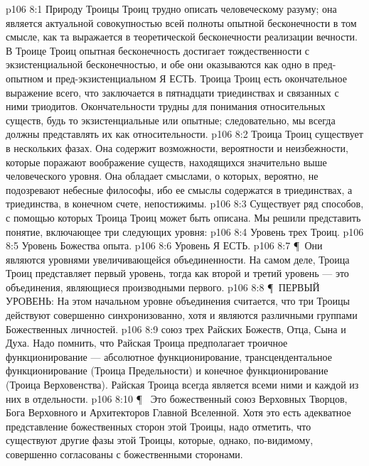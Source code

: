 \vs p106 8:1 Природу Троицы Троиц трудно описать человеческому разуму; она является актуальной совокупностью всей полноты опытной бесконечности в том смысле, как та выражается в теоретической бесконечности реализации вечности. В Троице Троиц опытная бесконечность достигает тождественности с экзистенциальной бесконечностью, и обе они оказываются как одно в пред\hyp{}опытном и пред\hyp{}экзистенциальном Я ЕСТЬ. Троица Троиц есть окончательное выражение всего, что заключается в пятнадцати триединствах и связанных с ними триодитов. Окончательности трудны для понимания относительных существ, будь то экзистенциальные или опытные; следовательно, мы всегда должны представлять их как относительности.
\vs p106 8:2 Троица Троиц существует в нескольких фазах. Она содержит возможности, вероятности и неизбежности, которые поражают воображение существ, находящихся значительно выше человеческого уровня. Она обладает смыслами, о которых, вероятно, не подозревают небесные философы, ибо ее смыслы содержатся в триединствах, а триединства, в конечном счете, непостижимы.
\vs p106 8:3 Существует ряд способов, с помощью которых Троица Троиц может быть описана. Мы решили представить понятие, включающее три следующих уровня:
\vs p106 8:4 \bibnobreakspace Уровень трех Троиц.
\vs p106 8:5 \bibnobreakspace Уровень Божества опыта.
\vs p106 8:6 \bibnobreakspace Уровень Я ЕСТЬ.
\vs p106 8:7 \P\ Они являются уровнями увеличивающейся объединенности. На самом деле, Троица Троиц представляет первый уровень, тогда как второй и третий уровень --- это объединения, являющиеся производными первого.
\vs p106 8:8 \P\ ПЕРВЫЙ УРОВЕНЬ: На этом начальном уровне объединения считается, что три Троицы действуют совершенно синхронизованно, хотя и являются различными группами Божественных личностей.
\vs p106 8:9 \bibnobreakspace {} союз трех Райских Божеств, Отца, Сына и Духа. Надо помнить, что Райская Троица предполагает троичное функционирование --- абсолютное функционирование, трансцендентальное функционирование (Троица Предельности) и конечное функционирование (Троица Верховенства). Райская Троица всегда является всеми ними и каждой из них в отдельности.
\vs p106 8:10 \P\ \bibnobreakspace {} Это божественный союз Верховных Творцов, Бога Верховного и Архитекторов Главной Вселенной. Хотя это есть адекватное представление божественных сторон этой Троицы, надо отметить, что существуют другие фазы этой Троицы, которые, однако, по\hyp{}видимому, совершенно согласованы с божественными сторонами.
